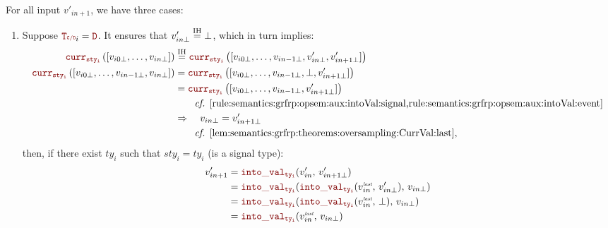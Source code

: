 \begin{skippableproof}
\begin{itemize}
              For all input $v'_{in+1}$, we have three cases:
              \begin{enumerate}
                  \item Suppose $\rType_i = \dType$. It ensures that $v'_{in\bot} \overset{\mathrm{IH}}{=} \bot$,
                        which in turn implies:
                        \begin{align*}
                            \CurrVal{sty_i}{[v_{i0\bot}, \dots, v_{in\bot}]}               & \myeq{IH} \CurrVal{sty_i}{[v_{i0\bot}, \dots, v_{in-1\bot}, v'_{in\bot}, v'_{in+1\bot}]}                            \\
                            \CurrVal{sty_i}{[v_{i0\bot}, \dots, v_{in-1\bot}, v_{in\bot}]} & = \CurrVal{sty_i}{[v_{i0\bot}, \dots, v_{in-1\bot}, \bot, v'_{in+1\bot}]}                                           \\
                                                                                           & = \CurrVal{sty_i}{[v_{i0\bot}, \dots, v_{in-1\bot}, v'_{in+1\bot}]}                                                 \\
                                                                                           & \qquad \text{\cf \Cref{rule:semantics:grfrp:opsem:aux:intoVal:signal,rule:semantics:grfrp:opsem:aux:intoVal:event}} \\
                                                                                           & \Rightarrow \quad v_{in\bot} = v'_{in+1\bot}                                                                        \\
                                                                                           & \qquad \text{\cf \Cref{lem:semantics:grfrp:theorems:oversampling:CurrVal:last}},
                        \end{align*}
                        then, if there exist $ty_i$ such that $sty_i = ty_i$ (\ie is a signal type):
                        \begin{align*}
                            v'_{in+1} & = \intoVal{ty_i}{v'_{in}}{v'_{in+1\bot}}                                     \\
                                      & = \intoVal{ty_i}{\intoVal{ty_i}{v_{in}^{\explast}}{v'_{in\bot}}}{v_{in\bot}} \\
                                      & = \intoVal{ty_i}{\intoVal{ty_i}{v_{in}^{\explast}}{\bot}}{v_{in\bot}}        \\
                                      & = \intoVal{ty_i}{v_{in}^{\explast}}{v_{in\bot}}                              \\

\end{align*}
\end{enumerate}
\end{itemize}
\end{skippableproof}
